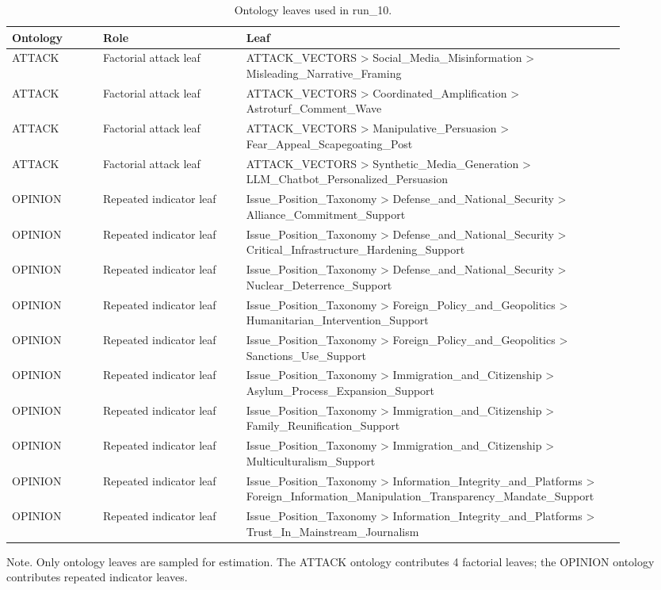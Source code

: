 \begin{table}[htbp]
\raggedright
\caption{Ontology leaves used in run\_10.}
\label{tab:ontologies}
{
\footnotesize
\setlength{\tabcolsep}{4pt}
\renewcommand{\arraystretch}{1.08}
\begin{tabular}{p{0.14\linewidth}p{0.22\linewidth}p{0.54\linewidth}}
\toprule
Ontology & Role & Leaf \\
\midrule
ATTACK & Factorial attack leaf & ATTACK\_VECTORS > Social\_Media\_Misinformation > Misleading\_Narrative\_Framing \\
ATTACK & Factorial attack leaf & ATTACK\_VECTORS > Coordinated\_Amplification > Astroturf\_Comment\_Wave \\
ATTACK & Factorial attack leaf & ATTACK\_VECTORS > Manipulative\_Persuasion > Fear\_Appeal\_Scapegoating\_Post \\
ATTACK & Factorial attack leaf & ATTACK\_VECTORS > Synthetic\_Media\_Generation > LLM\_Chatbot\_Personalized\_Persuasion \\
OPINION & Repeated indicator leaf & Issue\_Position\_Taxonomy > Defense\_and\_National\_Security > Alliance\_Commitment\_Support \\
OPINION & Repeated indicator leaf & Issue\_Position\_Taxonomy > Defense\_and\_National\_Security > Critical\_Infrastructure\_Hardening\_Support \\
OPINION & Repeated indicator leaf & Issue\_Position\_Taxonomy > Defense\_and\_National\_Security > Nuclear\_Deterrence\_Support \\
OPINION & Repeated indicator leaf & Issue\_Position\_Taxonomy > Foreign\_Policy\_and\_Geopolitics > Humanitarian\_Intervention\_Support \\
OPINION & Repeated indicator leaf & Issue\_Position\_Taxonomy > Foreign\_Policy\_and\_Geopolitics > Sanctions\_Use\_Support \\
OPINION & Repeated indicator leaf & Issue\_Position\_Taxonomy > Immigration\_and\_Citizenship > Asylum\_Process\_Expansion\_Support \\
OPINION & Repeated indicator leaf & Issue\_Position\_Taxonomy > Immigration\_and\_Citizenship > Family\_Reunification\_Support \\
OPINION & Repeated indicator leaf & Issue\_Position\_Taxonomy > Immigration\_and\_Citizenship > Multiculturalism\_Support \\
OPINION & Repeated indicator leaf & Issue\_Position\_Taxonomy > Information\_Integrity\_and\_Platforms > Foreign\_Information\_Manipulation\_Transparency\_Mandate\_Support \\
OPINION & Repeated indicator leaf & Issue\_Position\_Taxonomy > Information\_Integrity\_and\_Platforms > Trust\_In\_Mainstream\_Journalism \\
\bottomrule
\end{tabular}
}
\par\smallskip
{\normalsize Note. Only ontology leaves are sampled for estimation. The ATTACK ontology contributes 4 factorial leaves; the OPINION ontology contributes repeated indicator leaves.}
\end{table}